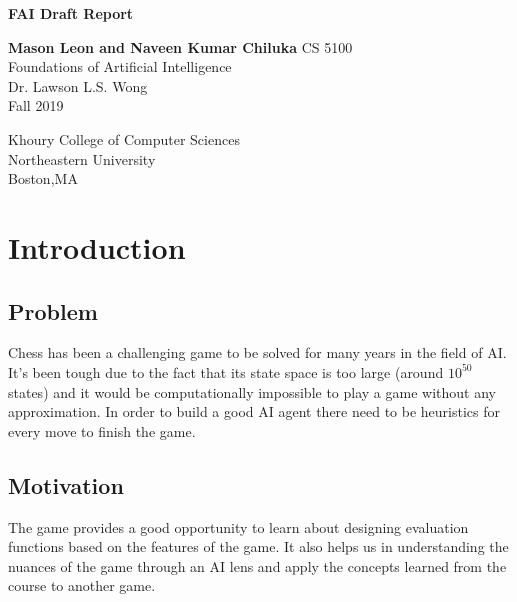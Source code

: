 \documentclass[12pt]{article}
\begin{document}
   \begin{center}
       \vspace*{1cm}
 
       \textbf{FAI Draft Report}
       \vspace{1cm}
       
       \textbf{Mason Leon and Naveen Kumar Chiluka}
        \vspace{1cm}
       CS 5100 \\
	Foundations of Artificial Intelligence \\
	Dr. Lawson L.S. Wong \\
	Fall 2019

 
       \vspace{0.8cm}

       Khoury College of Computer Sciences\\
       Northeastern University\\
       Boston,MA\\
        
   \end{center}
 
\tableofcontents

\clearpage
\section{Introduction}
\subsection{Problem}
Chess has been a challenging game to be solved for many years in the field of AI. It's been tough due to the fact that its state space is too large (around $10^{50}$ states) and it would be computationally impossible to play a game without any approximation. In order to build a good AI agent there need to be heuristics for every move to finish the game.

\subsection{Motivation} The game provides a good opportunity to learn about designing evaluation functions based on the features of the game. It also helps us in understanding the nuances of the game through an AI lens and apply the concepts learned from  the course to another game.
\end{document}
